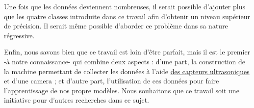 Une fois que les données deviennent nombreuses, il serait possible d'ajouter plus
que les quatre classes introduite dans ce travail afin d'obtenir un niveau supérieur
de précision. Il serait même possible d'aborder ce problème dans sa nature régressive.

Enfin, nous savons bien que ce travail est loin d'être parfait, mais il est le
premier -à notre connaissance- qui combine deux aspects : d'une part, la construction de la
machine permettant de collecter les données à l'aide \underline{des capteurs ultrasoniques}
et d'une camera ; et d'autre part, l'utilisation de ces données pour faire l'apprentissage
de nos propre modèles. Nous souhaitons que ce travail soit une initiative pour d'autres
recherches dans ce sujet.
